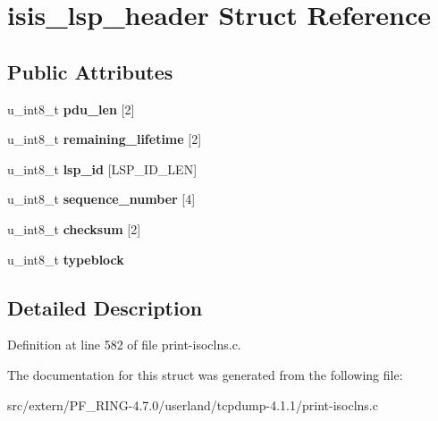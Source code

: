 \hypertarget{structisis__lsp__header}{
\section{isis\_\-lsp\_\-header Struct Reference}
\label{structisis__lsp__header}
}
\subsection*{Public Attributes}
\begin{DoxyCompactItemize}
\item 
\hypertarget{structisis__lsp__header_a9710c85e81a2ef43ebd018e40daf3028}{
u\_\-int8\_\-t {\bfseries pdu\_\-len} \mbox{[}2\mbox{]}}
\label{structisis__lsp__header_a9710c85e81a2ef43ebd018e40daf3028}

\item 
\hypertarget{structisis__lsp__header_af2107512b83d4b112e361405871027dc}{
u\_\-int8\_\-t {\bfseries remaining\_\-lifetime} \mbox{[}2\mbox{]}}
\label{structisis__lsp__header_af2107512b83d4b112e361405871027dc}

\item 
\hypertarget{structisis__lsp__header_abafade66caae7ec92c694a4acbec5e82}{
u\_\-int8\_\-t {\bfseries lsp\_\-id} \mbox{[}LSP\_\-ID\_\-LEN\mbox{]}}
\label{structisis__lsp__header_abafade66caae7ec92c694a4acbec5e82}

\item 
\hypertarget{structisis__lsp__header_ac322a13a2ea034ce3880f3531a1e69ca}{
u\_\-int8\_\-t {\bfseries sequence\_\-number} \mbox{[}4\mbox{]}}
\label{structisis__lsp__header_ac322a13a2ea034ce3880f3531a1e69ca}

\item 
\hypertarget{structisis__lsp__header_ac1ff5abbc71501e58ac3ac869324d47c}{
u\_\-int8\_\-t {\bfseries checksum} \mbox{[}2\mbox{]}}
\label{structisis__lsp__header_ac1ff5abbc71501e58ac3ac869324d47c}

\item 
\hypertarget{structisis__lsp__header_a428042238e273726635ee23cf4fee844}{
u\_\-int8\_\-t {\bfseries typeblock}}
\label{structisis__lsp__header_a428042238e273726635ee23cf4fee844}

\end{DoxyCompactItemize}


\subsection{Detailed Description}


Definition at line 582 of file print-\/isoclns.c.



The documentation for this struct was generated from the following file:\begin{DoxyCompactItemize}
\item 
src/extern/PF\_\-RING-\/4.7.0/userland/tcpdump-\/4.1.1/print-\/isoclns.c\end{DoxyCompactItemize}
